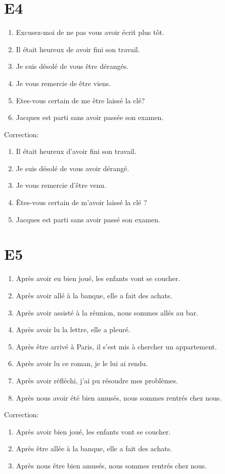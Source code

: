\documentclass{book}
\begin{document}
    \section{E4}
        \begin{enumerate}
            \item Excusez-moi de ne pas vous avoir écrit plus tôt.
            \item Il était heureux de avoir fini son travail.
            \item Je suis désolé de vous être dérangés.
            \item Je vous remercie de être viens.
            \item Etes-vous certain de me être laissé la clé?
            \item Jacques est parti sans avoir passée son examen.
        \end{enumerate}
        Correction:
        \begin{enumerate}
            \item Il était heureux d'avoir fini son travail.
            \item Je suis désolé de vous avoir dérangé.
            \item Je vous remercie d'être venu.
            \item Êtes-vous certain de m'avoir laissé la clé ?
            \item Jacques est parti sans avoir passé son examen.
        \end{enumerate}

    \section{E5}
        \begin{enumerate}
            \item Après avoir eu bien joué, les enfants vont se coucher.
            \item Après avoir allé à la banque, elle a fait des achats.
            \item Après avoir assisté à la réunion, nous sommes allés au bar.
            \item Après avoir lu la lettre, elle a pleuré.
            \item Après être arrivé à Paris, il s'est mis à chercher un appartement.
            \item Après avoir lu ce roman, je le lui ai rendu.
            \item Après avoir réfléchi, j'ai pu résoudre mes problèmes.
            \item Après nous avoir été bien amusés, nous sommes rentrés chez nous.
        \end{enumerate}
        Correction:
        \begin{enumerate}
            \item Après avoir bien joué, les enfants vont se coucher.
            \item Après être allée à la banque, elle a fait des achats.
            \item Après nous être bien amusés, nous sommes rentrés chez nous.
        \end{enumerate}
\end{document}
